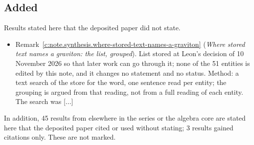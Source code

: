 \documentclass[11pt]{article}
\theoremstyle{definition}
\theoremstyle{plain}
\begin{document}
\subsection*{Added}
Results stated here that the deposited paper did not state.
\begin{itemize}\setlength{\itemsep}{2pt}
\item Remark~\ref{c:note.synthesis.where-stored-text-names-a-graviton} (\emph{Where stored text names a graviton: the list, grouped}). List stored at Leon's decision of 10 November 2026 so that later work can go through it; none of the 51 entities is edited by this note, and it changes no statement and no status. Method: a text search of the store for the word, one sentence read per entity; the grouping is argued from that reading, not from a full reading of each entity. The search was [...]
\end{itemize}
\noindent In addition, 45 results from elsewhere in the series or the algebra core are stated here that the deposited paper cited or used without stating; 3 results gained citations only. These are not marked.
\end{document}
